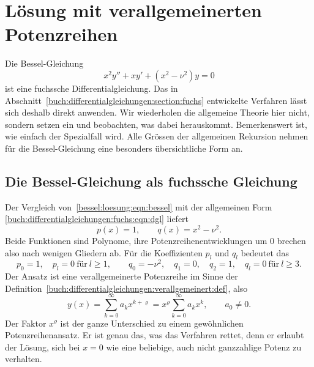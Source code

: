 %
%
%
%
\section{Lösung mit verallgemeinerten Potenzreihen
\label{bessel:section:loesung}}
Die Bessel-Gleichung
\begin{equation}
x^2y'' + xy' + (x^2-\nu^2)y = 0
\label{bessel:loesung:eqn:bessel}
\end{equation}
ist eine fuchssche Differentialgleichung.
Das in Abschnitt~\ref{buch:differentialgleichungen:section:fuchs} entwickelte Verfahren lässt sich deshalb direkt anwenden.
Wir wiederholen die allgemeine Theorie hier nicht, sondern setzen ein und beobachten, was dabei herauskommt.
Bemerkenswert ist, wie einfach der Spezialfall wird.
Alle Grössen der allgemeinen Rekursion nehmen für die Bessel-Gleichung eine besonders übersichtliche Form an.

%
%
\subsection{Die Bessel-Gleichung als fuchssche Gleichung
\label{bessel:loesung:subsection:fuchssch}}
Der Vergleich von~\eqref{bessel:loesung:eqn:bessel} mit der allgemeinen Form \eqref{buch:differentialgleichungen:fuchs:eqn:dgl} liefert
\begin{equation}
p(x) = 1,
\qquad
q(x) = x^2-\nu^2.
\label{bessel:loesung:eqn:pq}
\end{equation}
Beide Funktionen sind Polynome, ihre Potenzreihenentwicklungen um $0$ brechen also nach wenigen Gliedern ab.
Für die Koeffizienten $p_l$ und $q_l$ bedeutet das
\begin{equation}
p_0 = 1,
\quad
p_l = 0
\ \text{für}\ l \ge 1,
\qquad
q_0 = -\nu^2,
\quad
q_1 = 0,
\quad
q_2 = 1,
\quad
q_l = 0
\ \text{für}\ l\ge 3.
\label{bessel:loesung:eqn:koeffizienten}
\end{equation}
Der Ansatz ist eine verallgemeinerte Potenzreihe im Sinne der Definition~\ref{buch:differentialgleichungen:verallgemeinert:def}, also
\begin{equation}
y(x)
=
\sum_{k=0}^\infty
a_k x^{k+\varrho}
=
x^\varrho
\sum_{k=0}^\infty
a_k x^k,
\qquad
a_0 \ne 0.
\label{bessel:loesung:eqn:ansatz}
\end{equation}
Der Faktor $x^\varrho$ ist der ganze Unterschied zu einem gewöhnlichen Potenzreihenansatz.
Er ist genau das, was das Verfahren rettet, denn er erlaubt der Lösung, sich bei $x=0$ wie eine beliebige, auch nicht ganzzahlige Potenz zu verhalten.

